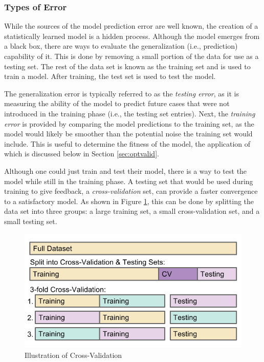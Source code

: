 \subsubsection{Types of Error}

While the sources of the model prediction error are well known, the creation of
a statistically learned model is a hidden process. Although the model emerges
from a black box, there are ways to evaluate the generalization (i.e.,
prediction) capability of it.  This is done by removing a small portion of the
data for use as a testing set.  The rest of the data set is known as the
training set and is used to train a model. After training, the test set is used
to test the model.  

The generalization error is typically referred to as the \textit{testing
error}, as it is measuring the ability of the model to predict future cases
that were not introduced in the training phase (i.e., the testing set entries).
Next, the \textit{training error} is provided by comparing the model
predictions to the training set, as the model would likely be smoother than the
potential noise the training set would include. This is useful to determine the
fitness of the model, the application of which is discussed below in Section
\ref{sec:optvalid}.

Although one could just train and test their model, there is a way to test the
model while still in the training phase. A testing set that would be used
during training to give feedback, a \textit{cross-validation} set, can provide
a faster convergence to a satisfactory model. As shown in Figure
\ref{fig:cverror}, this can be done by splitting the data set into three
groups: a large training set, a small cross-validation set, and a small testing
set. 

\begin{figure}[!htb]
  \centering
  \includegraphics[width=0.85\linewidth]{./chapters/litrev/cverror.png}
  \caption{Illustration of Cross-Validation}
  \label{fig:cverror}
\end{figure}

